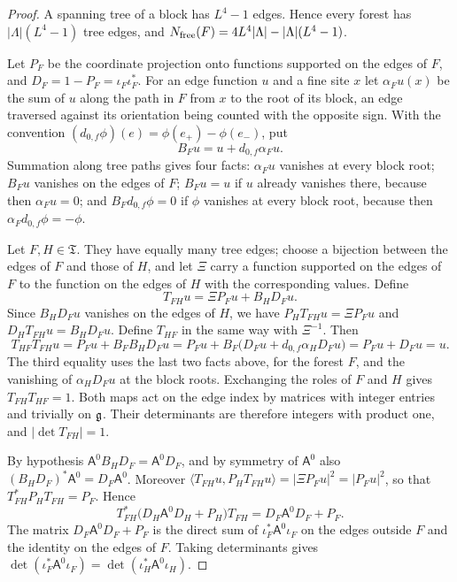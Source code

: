\begin{proof}
A spanning tree of a block has $L^4-1$ edges. Hence every forest has
$|\Lambda|(L^4-1)$ tree edges, and
$N_{\rm free}(F)=4L^4|\Lambda|-|\Lambda|(L^4-1)$.

Let $P_F$ be the coordinate projection onto functions supported on the
edges of $F$, and $D_F=1-P_F=\iota_F\iota_F^*$. For an edge function $u$
and a fine site $x$ let $\alpha_Fu(x)$ be the sum of $u$ along the path
in $F$ from $x$ to the root of its block, an edge traversed against its
orientation being counted with the opposite sign. With the convention
$(d_{0,f}\phi)(e)=\phi(e_+)-\phi(e_-)$, put
\[
 B_Fu=u+d_{0,f}\alpha_Fu .
\]
Summation along tree paths gives four facts: $\alpha_Fu$ vanishes at
every block root; $B_Fu$ vanishes on the edges of $F$; $B_Fu=u$ if $u$
already vanishes there, because then $\alpha_Fu=0$; and
$B_Fd_{0,f}\phi=0$ if $\phi$ vanishes at every block root, because then
$\alpha_Fd_{0,f}\phi=-\phi$.

Let $F,H\in\mathfrak T$. They have equally many tree edges; choose a
bijection between the edges of $F$ and those of $H$, and let $\Xi$
carry a function supported on the edges of $F$ to the function on the
edges of $H$ with the corresponding values. Define
\[
 T_{FH}u=\Xi P_Fu+B_HD_Fu .
\]
Since $B_HD_Fu$ vanishes on the edges of $H$, we have
$P_HT_{FH}u=\Xi P_Fu$ and $D_HT_{FH}u=B_HD_Fu$. Define $T_{HF}$ in
the same way with $\Xi^{-1}$. Then
\[
 T_{HF}T_{FH}u=P_Fu+B_FB_HD_Fu
   =P_Fu+B_F\bigl(D_Fu+d_{0,f}\alpha_HD_Fu\bigr)=P_Fu+D_Fu=u .
\]
The third equality uses the last two facts above, for the forest $F$,
and the vanishing of $\alpha_HD_Fu$ at the block roots. Exchanging the
roles of $F$ and $H$ gives $T_{FH}T_{HF}=1$. Both maps act on the edge
index by matrices with integer entries and trivially on $\mathfrak g$. Their
determinants are therefore integers with product one, and
$|\det T_{FH}|=1$.

By hypothesis $\mathsf A^0B_HD_F=\mathsf A^0D_F$, and by symmetry of
$\mathsf A^0$ also $(B_HD_F)^*\mathsf A^0=D_F\mathsf A^0$. Moreover
$\langle T_{FH}u,P_HT_{FH}u\rangle=|\Xi P_Fu|^2=|P_Fu|^2$, so that
$T_{FH}^*P_HT_{FH}=P_F$. Hence
\[
 T_{FH}^*\bigl(D_H\mathsf A^0D_H+P_H\bigr)T_{FH}
   =D_F\mathsf A^0D_F+P_F .
\]
The matrix $D_F\mathsf A^0D_F+P_F$ is the direct sum of
$\iota_F^*\mathsf A^0\iota_F$ on the edges outside $F$ and the identity
on the edges of $F$. Taking determinants gives
$\det(\iota_F^*\mathsf A^0\iota_F)=\det(\iota_H^*\mathsf A^0\iota_H)$.
\end{proof}

